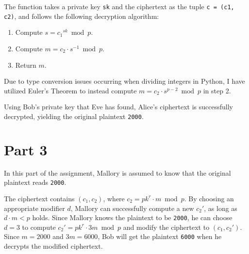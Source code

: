 \documentclass[12pt,a4paper]{article}
\begin{document}
    The function takes a private key \texttt{sk} and the ciphertext as the
    tuple \texttt{c = (c1, c2)}, and follows the following decryption
    algorithm:

    \begin{enumerate}
        \item Compute $s = {c_1}^{sk} \bmod p$.
        \item Compute $m = c_2 \cdot s^{-1} \bmod p$.
        \item Return $m$.
    \end{enumerate}

    Due to type conversion issues occurring when dividing integers in Python,
    I have utilized Euler's Theorem to instead compute $m = c_2 \cdot s^{p -
    2} \bmod p$ in step 2.

    Using Bob's private key that Eve has found, Alice's ciphertext is
    successfully decrypted, yielding the original plaintext \texttt{2000}.

    \section*{Part 3}

    In this part of the assignment, Mallory is assumed to know that the
    original plaintext reads \texttt{2000}.

    The ciphertext contains $(c_1, c_2)$, where $c_2 = {pk}^r \cdot m \bmod
    p$. By choosing an appropriate modifier $d$, Mallory can successfully
    compute a new $c_2'$, as long as $d \cdot m < p$ holds. Since Mallory
    knows the plaintext to be \texttt{2000}, he can choose $d = 3$ to compute
    $c_2' = {pk}^r \cdot 3m \bmod p$ and modify the ciphertext to $(c_1,
    c_2')$. Since $m = 2000$ and $3m = 6000$, Bob will get the plaintext
    \texttt{6000} when he decrypts the modified ciphertext.
\end{document}
